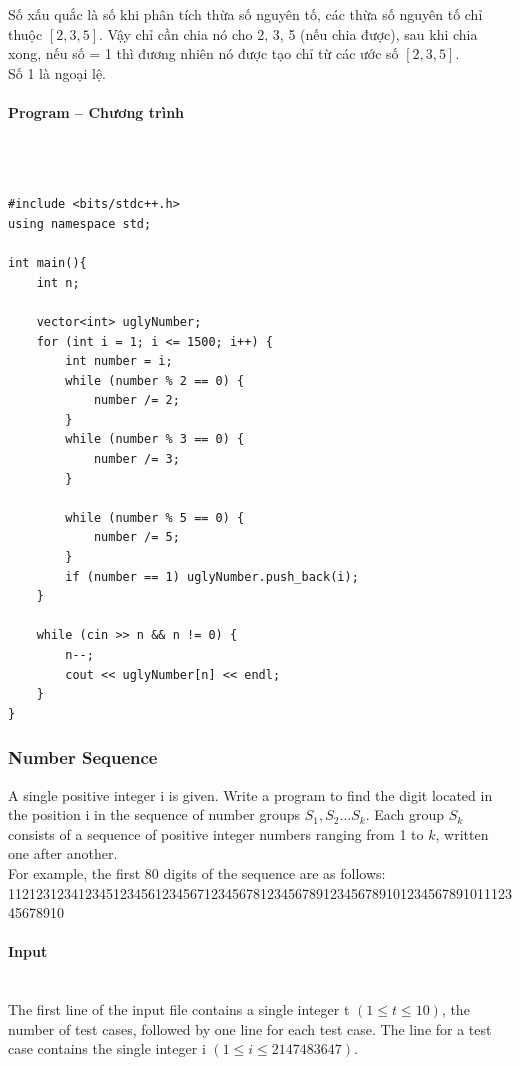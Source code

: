 \documentclass{article}
\begin{document}
Số xấu quắc là số khi phân tích thừa số nguyên tố, các thừa số nguyên tố chỉ thuộc $[2,3,5]$. Vậy chỉ cần chia nó cho 2, 3, 5 (nếu chia được), sau khi chia xong, nếu số = 1 thì đương nhiên nó được tạo chỉ từ các ước số $[2,3,5]$. \\

Số 1 là ngoại lệ.

\paragraph{Program -- Chương trình} \mbox{} \\


\begin{lstlisting}

#include <bits/stdc++.h>
using namespace std;

int main(){
	int n;

	vector<int> uglyNumber;
	for (int i = 1; i <= 1500; i++) {
		int number = i;
		while (number % 2 == 0) {
			number /= 2;
		}
		while (number % 3 == 0) {
			number /= 3;
		}

		while (number % 5 == 0) {
			number /= 5;
		}
		if (number == 1) uglyNumber.push_back(i);
	}

	while (cin >> n && n != 0) {
		n--;
		cout << uglyNumber[n] << endl;
	}
}
\end{lstlisting}


\subsubsection{Number Sequence}

A single positive integer i is given. Write a program to find the digit located in the position i in the sequence of number groups $S_1,S_2 …S_k$. Each group $S_k$ consists of a sequence of positive integer numbers ranging from 1 to $k$, written one after another.\\
For example, the first 80 digits of the sequence are as follows: \\
11212312341234512345612345671234567812345678912345678910123456789101112345678910
\paragraph{Input} \mbox{} \\

The first line of the input file contains a single integer t $(1 \leq t \leq 10)$, the number of test cases, followed by one line for each test case. The line for a test case contains the single integer i $(1 \leq i \leq 2147483647)$.
\end{document}
